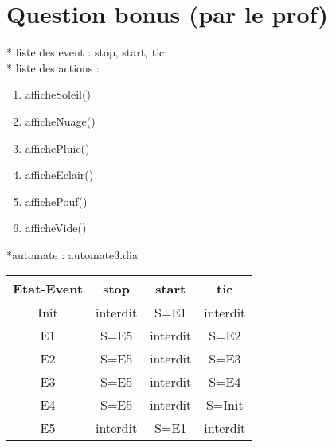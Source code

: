 \documentclass[10pt,a4paper]{article}
\begin{document}
\section*{Question bonus (par le prof)}

* liste des event : stop, start, tic\\
* liste des actions :
\begin{enumerate}
    \item afficheSoleil()
    \item afficheNuage()
    \item affichePluie()
    \item afficheEclair()
    \item affichePouf()
    \item afficheVide()
\end{enumerate}
*automate : automate3.dia

\begin{tabular}{c|c|c|c}
\hline
Etat-Event & stop & start & tic \\
\hline
Init & interdit & S=E1 & interdit \\
\hline
E1 & S=E5 & interdit & S=E2 \\
\hline
E2 & S=E5 & interdit & S=E3 \\
\hline
E3 & S=E5 & interdit & S=E4 \\
\hline
E4 & S=E5 & interdit & S=Init \\
\hline
E5 & interdit & S=E1 & interdit

\end{tabular}
\end{document}
